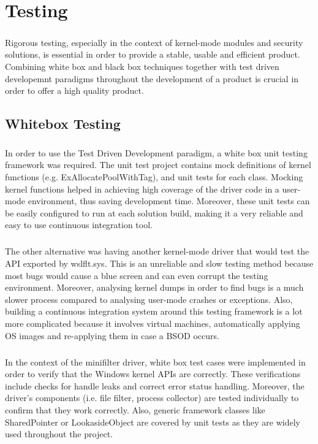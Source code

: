\chapter{Testing}
    \paragraph{}
    Rigorous testing, especially in the context of kernel-mode modules and security solutions, is essential in order to provide a stable,
    usable and efficient product. Combining white box and black box techniques together with test driven developemnt paradigms throughout
    the development of a product is crucial in order to offer a high quality product.
    
    \section{Whitebox Testing}
        \paragraph{}
        In order to use the Test Driven Development paradigm, a white box unit testing framework was required. The unit test project contains
        mock definitions of kernel functions (e.g. ExAllocatePoolWithTag), and unit tests for each class. Mocking kernel functions helped in
        achieving high coverage of the driver code in a user-mode environment, thus saving development time. Moreover, these unit tests can be
        easily configured to run at each solution build, making it a very reliable and easy to use continuous integration tool.
        
        \paragraph{}
        The other alternative was having another kernel-mode driver that would test the API exported by wslflt.sys. This is an unreliable
        and slow testing method because most bugs would cause a blue screen and can even corrupt the testing environment. Moreover, analysing
        kernel dumps in order to find bugs is a much slower process compared to analysing user-mode crashes or exceptions. Also, building a
        continuous integration system around this testing framework is a lot more complicated because it involves virtual machines,
        automatically applying OS images and re-applying them in case a BSOD occurs.

        \paragraph{}
        In the context of the minifilter driver, white box test cases were implemented in order to verify that the Windows kernel APIs are
        correctly. These verifications include checks for handle leaks and correct error status handling. Moreover, the driver's components
        (i.e. file filter, process collector) are tested individually to confirm that they work correctly. Also, generic framework classes like
        SharedPointer or LookasideObject are covered by unit tests as they are widely used throughout the project.
    

